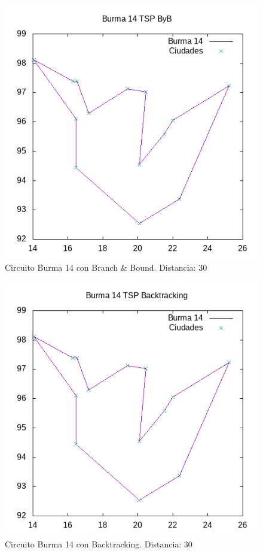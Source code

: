 \documentclass{article}
\begin{document}
	\begin{figure}[H]
		\centering
		\includegraphics[totalheight=6cm]{burma14byb}
		\caption{Circuito Burma 14 con Branch \& Bound. Distancia: 30}
		\label{fig:b14byb}
	\end{figure}

	\begin{figure}[H]
		\centering
		\includegraphics[totalheight=6cm]{burma14back}
		\caption{Circuito Burma 14 con Backtracking. Distancia: 30}
		\label{fig:b14back}
	\end{figure}
\end{document}
